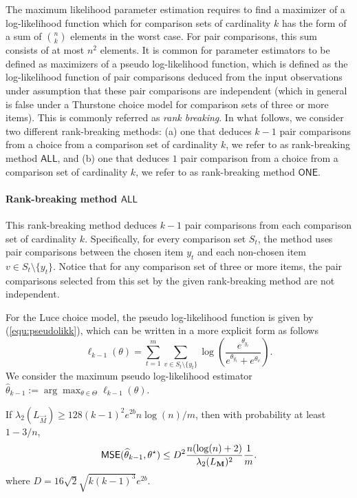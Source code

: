 The maximum likelihood parameter estimation requires to find a maximizer of a log-likelihood function which for comparison sets of cardinality $k$ has the form of a sum of $\binom{n}{k}$ elements in the worst case. For pair comparisons, this sum consists of at most $n^2$ elements. It is common for parameter estimators to be defined as maximizers of a pseudo log-likelihood function, which is defined as the log-likelihood function of pair comparisons deduced from the input observations under assumption that these pair comparisons are independent (which in general is false under a Thurstone choice model for comparison sets of three or more items). This is commonly referred as \emph{rank breaking}. In what follows, we consider two different rank-breaking methods: (a) one that deduces $k-1$ pair comparisons from a choice from a comparison set of cardinality $k$, we refer to as rank-breaking method $\mathsf{ALL}$, and (b) one that deduces $1$ pair comparison from a choice from a comparison set of cardinality $k$, we refer to as rank-breaking method $\mathsf{ONE}$. 

\label{sec:rankA}
\paragraph{Rank-breaking method $\mathsf{ALL}$} This rank-breaking method deduces $k-1$ pair comparisons from each comparison set of cardinality $k$. Specifically, for every comparison set $S_t$, the method uses pair comparisons between the chosen item $y_t$ and each non-chosen item $v\in S_t\setminus\{ y_t\}$. Notice that for any comparison set of three or more items, the pair comparisons selected from this set by the given rank-breaking method are not independent. 

For the Luce choice model, the pseudo log-likelihood function is given by (\ref{equ:pseudolikk}), which can be written in a more explicit form as follows
$$
\ell_{k-1}(\theta) = \sum_{t=1}^m\sum_{v\in S_t\setminus\{y_t \}} \log\left(\frac{e^{\theta_{y_t}}}{e^{\theta_{y_t}} + e^{\theta_v}}\right).
$$
We consider the maximum pseudo log-likelihood estimator $\widehat{\theta}_{k-1} := \arg \max_{\theta \in \Theta} \ell_{k-1}(\theta)$.
 
\begin{theorem} If $\lambda_2\left(L_\vec{M} \right) \ge 128(k-1)^2e^{2b} n\log (n)/m$, then with probability at least $1-3/n$,
$$
\hbox{\textup{\textsf{MSE}}}(\widehat{\theta}_{k-1}, \theta^\star) \le D^2 
\frac{n(\log(n)+2)}{\lambda_2(L_\mathbf{M})^2}\frac{1}{m}. 
$$
where $D = 16\sqrt{2}\sqrt{k(k-1)^3} e^{2b}$.
\label{thm:break-1}
\end{theorem} 

